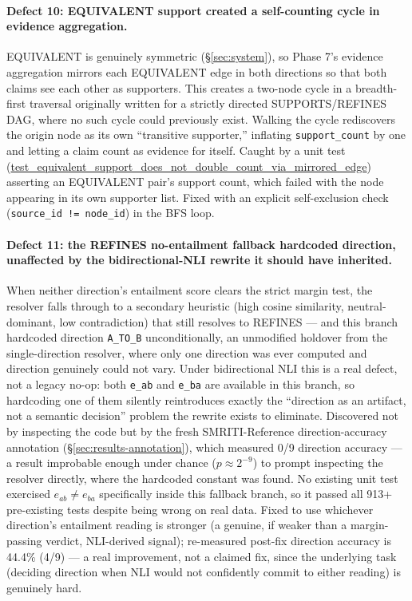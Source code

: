 \paragraph{Defect 10: EQUIVALENT support created a self-counting cycle in
evidence aggregation.} EQUIVALENT is genuinely symmetric (\S\ref{sec:system}),
so Phase 7's evidence aggregation mirrors each EQUIVALENT edge in both
directions so that both claims see each other as supporters. This creates
a two-node cycle in a breadth-first traversal originally written for a
strictly directed SUPPORTS/REFINES DAG, where no such cycle could
previously exist. Walking the cycle rediscovers the origin node as its
own ``transitive supporter,'' inflating \texttt{support\_count} by one
and letting a claim count as evidence for itself. Caught by a unit test
(\url{test_equivalent_support_does_not_double_count_via_mirrored_edge})
asserting an EQUIVALENT pair's support count, which
failed with the node appearing in its own supporter list. Fixed with an
explicit self-exclusion check (\texttt{source\_id != node\_id}) in the
BFS loop.

\paragraph{Defect 11: the REFINES no-entailment fallback hardcoded
direction, unaffected by the bidirectional-NLI rewrite it should have
inherited.} When neither direction's entailment score clears the strict
margin test, the resolver falls through to a secondary heuristic
(high cosine similarity, neutral-dominant, low contradiction) that still
resolves to REFINES --- and this branch hardcoded direction
\texttt{A\_TO\_B} unconditionally, an unmodified holdover from the
single-direction resolver, where only one direction was ever computed
and direction genuinely could not vary. Under bidirectional NLI this is a
real defect, not a legacy no-op: both \texttt{e\_ab} and \texttt{e\_ba}
are available in this branch, so hardcoding one of them silently
reintroduces exactly the ``direction as an artifact, not a semantic
decision'' problem the rewrite exists to eliminate. Discovered not by
inspecting the code but by the fresh SMRITI-Reference direction-accuracy
annotation (\S\ref{sec:results-annotation}), which measured 0/9 direction
accuracy --- a result improbable enough under chance
($p \approx 2^{-9}$) to prompt inspecting the resolver directly, where
the hardcoded constant was found. No existing unit test exercised
$e_{ab} \neq e_{ba}$ specifically inside this fallback branch, so it
passed all 913+ pre-existing tests despite being wrong on real data.
Fixed to use whichever direction's entailment reading is stronger (a
genuine, if weaker than a margin-passing verdict, NLI-derived signal);
re-measured post-fix direction accuracy is 44.4\% (4/9) --- a real
improvement, not a claimed fix, since the underlying task (deciding
direction when NLI would not confidently commit to either reading) is
genuinely hard.

